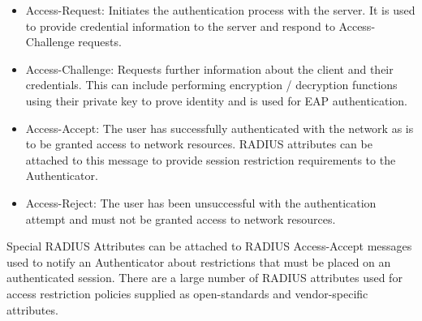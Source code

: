\begin{itemize}
    \item Access-Request:
    Initiates the authentication process with the server. It is used to provide credential information to the server and respond to Access-Challenge requests.
    
    \item Access-Challenge:
    Requests further information about the client and their credentials. This can include performing encryption / decryption functions using their private key to prove identity and is used for EAP authentication.
    
    \item Access-Accept:
    The user has successfully authenticated with the network as is to be granted access to network resources. RADIUS attributes can be attached to this message to provide session restriction requirements to the Authenticator.
    
    \item Access-Reject:
    The user has been unsuccessful with the authentication attempt and must not be granted access to network resources.
\end{itemize}

Special RADIUS Attributes can be attached to RADIUS Access-Accept messages used to notify an Authenticator about restrictions that must be placed on an authenticated session.
There are a large number of RADIUS attributes used for access restriction policies supplied as open-standards and vendor-specific attributes. 

